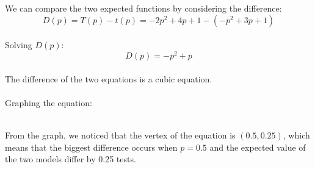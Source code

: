 \\
\\
We can compare the two expected functions by considering the difference:
\\
\begin{displaymath}
D(p)=T(p)-t(p)=-2p^2+4p+1-(-p^2+3p+1)
\end{displaymath}
\\
Solving $D(p):$
\\
\begin{displaymath}
D(p)=-p^2+p
\end{displaymath}
\\
The difference of the two equations is a cubic equation.
\\
\\
Graphing the equation:
\\
\begin{center}
\end{center}
\\
From the graph, we noticed that the vertex of the equation is $(0.5,0.25)$, which means that the biggest difference occurs when $p=0.5$ and the expected value of the two models differ by 0.25 tests.